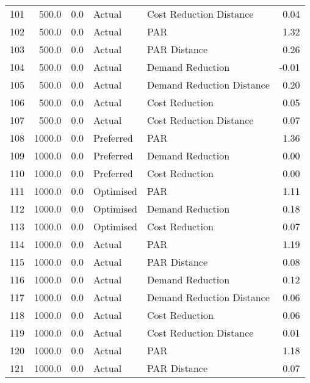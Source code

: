 \begin{longtable}{lrrllr}
101  &        500.0 &     0.0 &         Actual &    Cost Reduction Distance &   0.04 \\
102  &        500.0 &     0.0 &         Actual &                        PAR &   1.32 \\
103  &        500.0 &     0.0 &         Actual &               PAR Distance &   0.26 \\
104  &        500.0 &     0.0 &         Actual &           Demand Reduction &  -0.01 \\
105  &        500.0 &     0.0 &         Actual &  Demand Reduction Distance &   0.20 \\
106  &        500.0 &     0.0 &         Actual &             Cost Reduction &   0.05 \\
107  &        500.0 &     0.0 &         Actual &    Cost Reduction Distance &   0.07 \\
108  &       1000.0 &     0.0 &      Preferred &                        PAR &   1.36 \\
109  &       1000.0 &     0.0 &      Preferred &           Demand Reduction &   0.00 \\
110  &       1000.0 &     0.0 &      Preferred &             Cost Reduction &   0.00 \\
111  &       1000.0 &     0.0 &      Optimised &                        PAR &   1.11 \\
112  &       1000.0 &     0.0 &      Optimised &           Demand Reduction &   0.18 \\
113  &       1000.0 &     0.0 &      Optimised &             Cost Reduction &   0.07 \\
114  &       1000.0 &     0.0 &         Actual &                        PAR &   1.19 \\
115  &       1000.0 &     0.0 &         Actual &               PAR Distance &   0.08 \\
116  &       1000.0 &     0.0 &         Actual &           Demand Reduction &   0.12 \\
117  &       1000.0 &     0.0 &         Actual &  Demand Reduction Distance &   0.06 \\
118  &       1000.0 &     0.0 &         Actual &             Cost Reduction &   0.06 \\
119  &       1000.0 &     0.0 &         Actual &    Cost Reduction Distance &   0.01 \\
120  &       1000.0 &     0.0 &         Actual &                        PAR &   1.18 \\
121  &       1000.0 &     0.0 &         Actual &               PAR Distance &   0.07 \\

\end{longtable}
